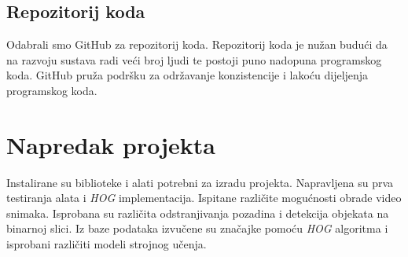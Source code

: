 \documentclass[times, utf8, seminar, numeric]{fer}
\begin{document}
\section{Repozitorij koda} 
Odabrali smo GitHub za repozitorij koda. Repozitorij koda je nužan budući da na razvoju sustava radi veći broj ljudi te postoji puno nadopuna programskog koda. GitHub pruža podršku za održavanje konzistencije i lakoću dijeljenja programskog koda. 

\chapter{Napredak projekta}

Instalirane su biblioteke i alati potrebni za izradu projekta. Napravljena su prva testiranja alata i \emph{HOG} implementacija. Ispitane različite mogućnosti obrade video snimaka. Isprobana su različita odstranjivanja pozadina i detekcija objekata na binarnoj slici. Iz baze podataka izvučene su značajke pomoću \emph{HOG} algoritma i isprobani različiti modeli strojnog učenja.

%
%

\end{document}
